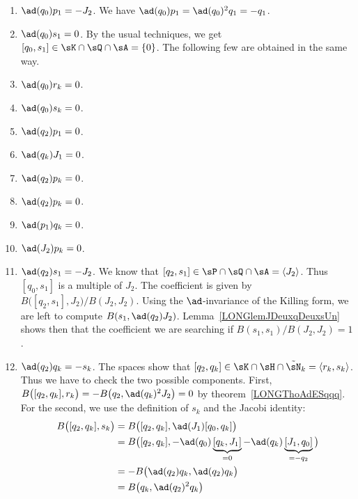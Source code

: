 \begin{enumerate}
	\item$\ad(q_0)p_1=-J_2$\label{LONGItemComqzpun}. We have $\ad(q_0)p_1=\ad(q_0)^2q_1=-q_1$.
	\item$\ad(q_0)s_1=0$. By the usual techniques, we get $[q_0,s_1]\in\sK\cap\sQ\cap\sA=\{ 0 \}$. The following few are obtained in the same way.
	\item$\ad(q_0)r_k=0$\label{LONGItemComqzrk}.
	\item$\ad(q_0)s_k=0$.
	\item$\ad(q_2)p_1=0$.
	\item$\ad(q_k)J_1=0$.
	\item$\ad(q_2)p_k=0$.	\label{ITEMooDSHGooXXAaKh}
	\item$\ad(q_2)p_k=0$.		\label{ITEMooHZDCooNMQZwb}
	\item$\ad(p_1)q_k=0$\label{LONGItemCompunqk}.
	\item$\ad(J_2)p_k=0$.
	\item$\ad(q_2)s_1=-J_2$. We know that $[q_2,s_1]\in\sP\cap\sQ\cap\sA=\langle J_2\rangle$. Thus $[q_0,s_1]$ is a multiple of $J_2$. The coefficient is given by$B\big( [q_2,s_1],J_2 \big)/B(J_2,J_2)$. Using the $\ad$-invariance of the Killing form, we are left to compute $B(s_1,\ad(q_2)J_2)$. Lemma~\ref{LONGlemJDeuxqDeuxsUn} shows then that the coefficient we are searching if $B(s_1,s_1)/B(J_2,J_2)=1$.
	\item\label{LONGItemComqdeuxqk}$\ad(q_2)q_k=-s_k$. The spaces show that $[q_2,q_k]\in\sK\cap\sH\cap\tilde\sN_k=\langle r_k,s_k\rangle$. Thus we have to check the two possible components. First, $B\big( [q_2,q_k],r_k \big)=-B\big( q_2,\ad(q_k)^2J_2 \big)=0$ by theorem~\ref{LONGThoAdESqqq}. For the second, we use the definition of $s_k$ and the Jacobi identity:
	      \begin{equation}
		      \begin{aligned}[]
			      B\big( [q_2,q_k],s_k \big) & =B\big( [q_2,q_k],\ad(J_1)[q_0,q_k] \big)                                                           \\
			                                 & =B\big( [q_2,q_k],-\ad(q_0)\underbrace{[q_k,J_1]}_{=0}-\ad(q_k)\underbrace{[J_1,q_0]}_{=-q_2} \big) \\
			                                 & =-B\big( \ad(q_2)q_k,\ad(q_2)q_k \big)                                                              \\
			                                 & =B\big( q_k,\ad(q_2)^2q_k \big)                                                                     \\

\end{aligned}
\end{equation}
\end{enumerate}
